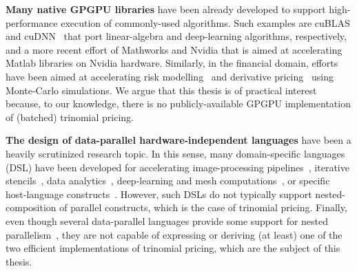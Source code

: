 {\bf Many native GPGPU libraries} have been already developed to support high-performance execution of commonly-used algorithms. Such examples are cuBLAS and cuDNN~\cite{cudnn} that port linear-algebra and deep-learning algorithms, respectively, and a more recent effort of Mathworks and Nvidia that is aimed at accelerating Matlab libraries on Nvidia hardware. Similarly, in the financial domain, efforts have been aimed at accelerating risk modelling~\cite{FinPar:TACO} and derivative pricing~\cite{LexiFiPricing} using Monte-Carlo simulations. We argue that this thesis is of practical interest because, to our knowledge, there is no publicly-available GPGPU implementation of (batched) trinomial pricing. 

{\bf The design of data-parallel hardware-independent languages} have been a heavily scrutinized research topic. In this sense, many domain-specific languages (DSL) have been developed for accelerating image-processing pipelines~\cite{Halide}, iterative stencils~\cite{tang2011pochoir}, data analytics~\cite{HPAT}, deep-learning and mesh computations~\cite{OP2-Mesh,DeliteDSLs}, or specific host-language constructs~\cite{Accelerate-ICFP,StreamJava8,svensson2011obsidian}. However, such DSLs do not typically support nested-composition of parallel constructs, which is the case of trinomial pricing. Finally, even though several data-parallel languages provide some support for nested parallelism~\cite{blelloch1994implementation,henriksen2017futhark}, they are not capable of expressing or deriving (at least) one of the two efficient implementations of trinomial pricing, which are the subject of this thesis.   


\newpage
